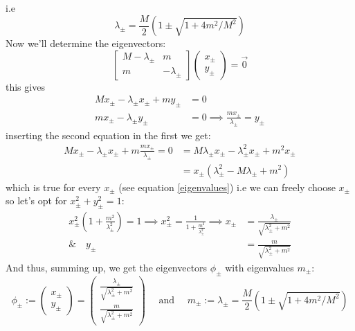 \documentclass[11pt,a4paper,faculty=we,language=en,doctype=report]{cls/ugent-doc}
\begin{document}
i.e
\begin{equation}
	\lambda_\pm = \frac{M}{2}\left( 1 \pm \sqrt{1 + 4m^2/M^2}\right)
\end{equation}
Now we'll determine the eigenvectors:
\begin{equation}
\left[\begin{array}{cc}
	M-\lambda_\pm & m \\
	m & -\lambda_\pm
\end{array}\right] \left(\begin{array}{c}
x_\pm \\
y_\pm
\end{array}\right) = \vec{0}
\end{equation}
this gives
\begin{align}
	Mx_\pm - \lambda_\pm x_\pm + my_\pm &= 0\\
	m x_\pm - \lambda_\pm y_\pm &= 0 \implies \frac{m x_\pm}{\lambda_\pm} = y_\pm
\end{align}
inserting the second equation in the first we get:
\begin{align}
	Mx_\pm - \lambda_\pm x_\pm + m \frac{m x_\pm}{\lambda_\pm} = 0 &= M\lambda_\pm x_\pm - \lambda_\pm^2 x_\pm + m^2 x_\pm\\
	&= x_\pm(\lambda_\pm^2 -M\lambda_\pm + m^2)
\end{align}
which is true for every $x_\pm$ (see equation \ref{eigenvalues}) i.e we can freely choose $x_\pm$ so let's opt for $x_\pm^2 + y_\pm^2 = 1$:
\begin{align}
	x_\pm^2(1+\frac{m^2}{\lambda_\pm^2}) = 1 \implies x^2_\pm = \frac{1}{1+\frac{m^2}{\lambda_\pm^2}} \implies x_\pm &= \frac{\lambda_\pm}{\sqrt{\lambda_\pm^2 + m^2}}\\
	\& \quad y_\pm &= \frac{m}{\sqrt{\lambda_\pm^2 + m^2}}
\end{align}
And thus, summing up, we get the eigenvectors $\phi_\pm$ with eigenvalues $m_\pm$:
\begin{equation}
	\phi_\pm := \left(\begin{array}{c}
		x_\pm\\
		y_\pm
	\end{array}\right) = \left(\begin{array}{c}
		\frac{\lambda_\pm}{\sqrt{\lambda_\pm^2 + m^2}}\\
		\frac{m}{\sqrt{\lambda_\pm^2 + m^2}}
	\end{array}\right) \quad \text{ and }\quad m_\pm := \lambda_\pm =  \frac{M}{2}\left( 1 \pm \sqrt{1 + 4m^2/M^2}\right)
\end{equation}
\end{document}
